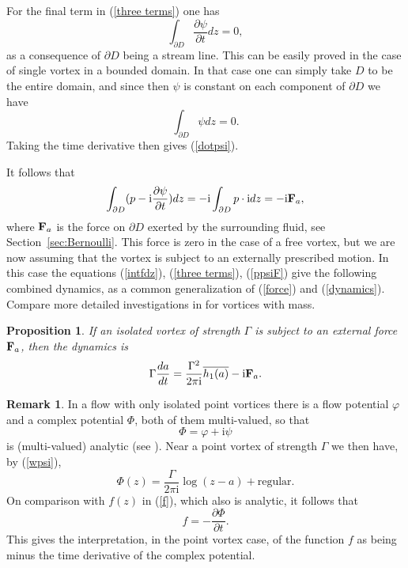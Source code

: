 \documentclass[reqno,12pt]{article}
\theoremstyle{plain}
\newtheorem{proposition}[thm]{Proposition}
\theoremstyle{definition}
\newtheorem{remark}[defn]{Remark}
\numberwithin{equation}{section}
\numberwithin{figure}{section}
\def\I{\mathrm{i}}
\begin{document}
For the final term in (\ref{three terms}) one has
\begin{equation}\label{dotpsi}
\int_{\partial D}\frac{\partial\psi}{\partial t}dz=0,
\end{equation}
as a consequence of $\partial D$ being a stream line. This can be easily proved in the case of 
single vortex in a bounded domain. In that case one can simply take $D$ to be the entire domain, and since 
then $\psi$ is constant on each component of $\partial D$ we have
$$
\int_{\partial D}\psi dz=0.
$$
Taking the time derivative then gives (\ref{dotpsi}). 

It follows that
\begin{equation}\label{ppsiF}
\int_{\partial D} (p -\I\frac{\partial \psi}{\partial t}) dz 
=-\I \int_{\partial D}p\cdot \I dz=-\I {\bf F}_a,
\end{equation}
where ${\bf F}_a$ is the force on $\partial D$ exerted by the surrounding fluid, see Section~\ref{sec:Bernoulli}.
This force is zero in the case of a free vortex, but we are now assuming that the vortex is subject to an externally
prescribed motion. In this case the equations (\ref{intfdz}), (\ref{three terms}), (\ref{ppsiF}) give the 
following combined dynamics, as a common generalization of (\ref{force}) and (\ref{dynamics}).
Compare more detailed investigations in \cite{Grotta-Koiller-Oliva-1994} for vortices with mass.

\begin{proposition}\label{prop:combined dynmaics}
If an isolated vortex of strength $\Gamma$ is subject to an external force ${\bf F}_a$, then the dynamics is
\begin{equation}\label{Gammadadt}
\Gamma\frac{da}{dt}=\frac{\Gamma^2}{2\pi\I}\overline{h_1(a)}-\I{\bf F}_a. 
\end{equation}
\end{proposition}
  
\begin{remark}\label{rem:Phi}
In a flow with only isolated point vortices there is a flow potential $\varphi$ and a complex potential $\Phi$,
both of them multi-valued, so that
\begin{equation}\label{Phipsi}
\Phi=\varphi +\I \psi
\end{equation}
is (multi-valued) analytic (see \cite{Marchioro-Pulvirenti-1994}).
Near a point vortex of strength $\Gamma$ we then have, by (\ref{wpsi}),
$$
\Phi(z)=\frac{\Gamma}{2\pi\I}\log (z-a)+\text{regular}.
$$
On comparison with $f(z)$ in (\ref{f}), which also is analytic, it follows that
\begin{equation}\label{Phi}
f=-\frac{\partial \Phi}{\partial t}.
\end{equation}
This gives the interpretation, in the point vortex case, of the function $f$ as being minus the time derivative of the complex potential.
\end{remark}
\end{document}
